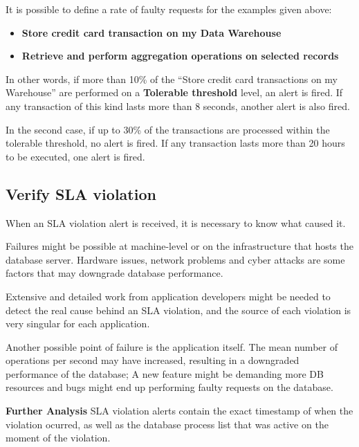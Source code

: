 It is possible to define a rate of faulty requests for the examples given above: 
\begin{itemize}
\item{ 
\textbf{Store credit card transaction on my Data Warehouse}
}

\item{
\textbf{Retrieve and perform aggregation operations on selected records}
}
\end{itemize}

In other words, if more than 10\% of the ``Store credit card transactions on my Warehouse'' are performed on a \textbf{Tolerable threshold} level, an alert is fired. If any transaction of this kind lasts more than 8 seconds, another alert is also fired. 

In the second case, if up to 30\% of the transactions are processed within the tolerable threshold, no alert is fired. If any transaction lasts more than 20 hours to be executed, one alert is fired.


\subsection {Verify SLA violation}

When an SLA violation alert is received, it is necessary to know what caused it.

Failures might be possible at machine-level or on the infrastructure that hosts the database server. Hardware issues, network problems and cyber attacks are some factors that may downgrade database performance.  

Extensive and detailed work from application developers might be needed to detect the real cause behind an SLA violation, and the source of each violation is very singular for each application.

Another possible point of failure is the application itself. The mean number of operations per second may have increased, resulting in a downgraded performance of the database; A new feature might be demanding more DB resources and bugs might end up performing faulty requests on the database.

\textbf{Further Analysis}
SLA violation alerts contain the exact timestamp of when the violation ocurred, as well as the database process list that was active on the moment of the violation. 

